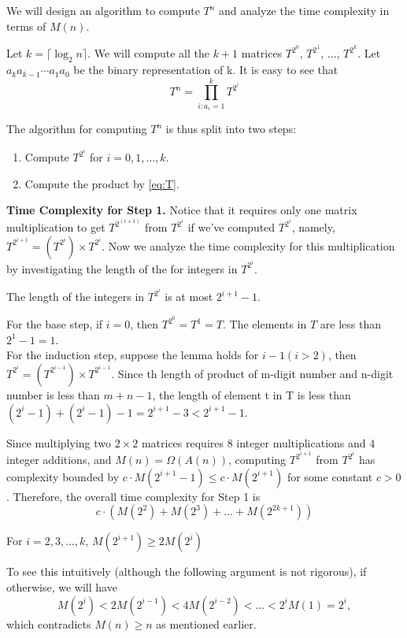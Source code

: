 We will design an algorithm to compute $T^{n}$ and analyze the time complexity in terms of $M(n)$.

Let $k=\lceil \log_2 n \rceil $. We will compute all the $k+1$ matrices $T^{2^0}$, $T^{2^1}$, $\ldots$, $T^{2^k}$. Let $a_k a_{k-1} \cdots a_1a_0$ be the binary representation of k. It is easy to see that
\begin{equation}
    T^n=\prod_{i:a_i=1}^{k} T^{2^i} 
    \label{eq:T}
\end{equation}

The algorithm for computing $T^{n}$ is thus split into two steps:
\begin{enumerate}
    \item Compute $T^{2^i}$ for $i=0,1,\ldots,k$.
    \item Compute the product by \eqref{eq:T}.
\end{enumerate}

\textbf{Time Complexity for Step 1.} Notice that it requires only one matrix multiplication to get $T^{2^{(i+1)}}$ from $T^{2^{i}}$ if we've computed $T^{2^i}$, namely, $T^{2^{i+1}}=(T^{2^i})\times T^{2^i}$.
Now we analyze the time complexity for this multiplication by investigating the length of the for integers in $T^{2^i}$.
\begin{lemma}
    The length of the integers in $T^{2^i}$ is at most $2^{i+1}-1$.
\end{lemma}
\begin{prf}
    For the base step, if $i=0$, then $T^{2^0}=T^{1}=T$. The elements in $T$ are less than $2^{1}-1=1$.\\
    For the induction step, suppose the lemma holds for $i-1(i>2)$, then $T^{2^i}=(T^{2^{i-1}})\times T^{2^{i-1}}$. 
    Since th length of product of m-digit number and n-digit number is less than $m+n-1$,
    the length of element t in T is less than $(2^i-1) + (2^i-1)-1 = 2^{i+1}-3 < 2^{i+1}-1$.
\end{prf}

Since multiplying two $2 \times 2$ matrices requires 8 integer multiplications and 4 integer additions, 
and $M(n) = \Omega(A(n))$, computing $T^{2^{i+1}}$ from $T^{2^i}$ has complexity bounded by $c \cdot M(2^{i+1} -1) \leq c \cdot M(2^{i+1})$ for some constant $c > 0$. Therefore, the overall time complexity for Step 1 is
\begin{equation}
    \label{eq:step1}
    c \cdot (M(2^2) + M(2^3) + \ldots + M(2^{2k+1}))
\end{equation}

\begin{lemma}
    For $i=2,3,\ldots,k$, $M(2^{i+1}) \geq 2M(2^i)$
\end{lemma}
\begin{prf}
To see this intuitively (although the following argument is not rigorous), if otherwise, we will have
\[M(2^i) < 2M(2^{i-1}) < 4M(2^{i-2}) < \ldots < 2^iM(1) = 2^i,\]
which contradicts $M(n) \geq n$ as mentioned earlier.
\end{prf}

